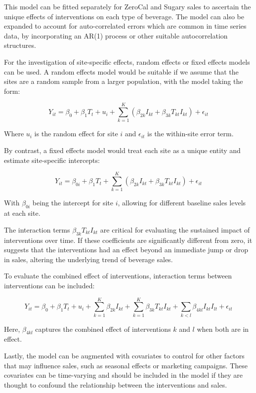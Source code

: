 \documentclass[
]{article}
\begin{document}
This model can be fitted separately for ZeroCal and Sugary sales to
ascertain the unique effects of interventions on each type of beverage.
The model can also be expanded to account for auto-correlated errors
which are common in time series data, by incorporating an AR(1) process
or other suitable autocorrelation structures.

For the investigation of site-specific effects, random effects or fixed
effects models can be used. A random effects model would be suitable if
we assume that the sites are a random sample from a larger population,
with the model taking the form:

\[Y_{it} = \beta_0 + \beta_1 T_t + u_i + \sum_{k=1}^{K} (\beta_{2k} I_{kt} + \beta_{3k} T_{kt} I_{kt}) + \epsilon_{it} \]

Where \(u_i\) is the random effect for site \(i\) and \(\epsilon_{it}\)
is the within-site error term.

By contrast, a fixed effects model would treat each site as a unique
entity and estimate site-specific intercepts:

\[Y_{it} = \beta_{0i} + \beta_1 T_t + \sum_{k=1}^{K} (\beta_{2k} I_{kt} + \beta_{3k} T_{kt} I_{kt}) + \epsilon_{it} \]

With \(\beta_{0i}\) being the intercept for site \(i\), allowing for
different baseline sales levels at each site.

The interaction terms \(\beta_{3k} T_{kt} I_{kt}\) are critical for
evaluating the sustained impact of interventions over time. If these
coefficients are significantly different from zero, it suggests that the
interventions had an effect beyond an immediate jump or drop in sales,
altering the underlying trend of beverage sales.

To evaluate the combined effect of interventions, interaction terms
between interventions can be included:

\[Y_{it} = \beta_0 + \beta_1 T_t + u_i + \sum_{k=1}^{K} \beta_{2k} I_{kt} + \sum_{k=1}^{K} \beta_{3k} T_{kt} I_{kt} + \sum_{k<l} \beta_{4kl} I_{kt} I_{lt} + \epsilon_{it} \]

Here, \(\beta_{4kl}\) captures the combined effect of interventions
\(k\) and \(l\) when both are in effect.

Lastly, the model can be augmented with covariates to control for other
factors that may influence sales, such as seasonal effects or marketing
campaigns. These covariates can be time-varying and should be included
in the model if they are thought to confound the relationship between
the interventions and sales.
\end{document}

